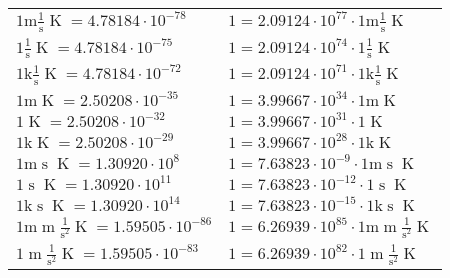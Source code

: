 \begin{center}
\begin{longtable}{l l}
{\color{gray}$1 \bm{\mathrm{ m}}{}\frac1{\operatorname{s}}{}{\operatorname{K}} = 4.78184\cdot10^{-78} $}   & {\color{gray}$ 1 = 2.09124\cdot10^{77} \cdot 1 \bm{\mathrm{ m}}{}\frac1{\operatorname{s}}{}{\operatorname{K}}$}  \\
{\color{black}$1 \bm{\mathrm{ }}{}\frac1{\operatorname{s}}{}{\operatorname{K}} = 4.78184\cdot10^{-75} $}   & {\color{black}$ 1 = 2.09124\cdot10^{74} \cdot 1 \bm{\mathrm{ }}{}\frac1{\operatorname{s}}{}{\operatorname{K}}$}  \\
{\color{gray}$1 \bm{\mathrm{ k}}{}\frac1{\operatorname{s}}{}{\operatorname{K}} = 4.78184\cdot10^{-72} $}   & {\color{gray}$ 1 = 2.09124\cdot10^{71} \cdot 1 \bm{\mathrm{ k}}{}\frac1{\operatorname{s}}{}{\operatorname{K}}$}  \\
{\color{gray}$1 \bm{\mathrm{ m}}{}{}{}{\operatorname{K}} = 2.50208\cdot10^{-35} $}   & {\color{gray}$ 1 = 3.99667\cdot10^{34} \cdot 1 \bm{\mathrm{ m}}{}{}{}{\operatorname{K}}$}  \\
{\color{black}$1 \bm{\mathrm{ }}{}{}{}{\operatorname{K}} = 2.50208\cdot10^{-32} $}   & {\color{black}$ 1 = 3.99667\cdot10^{31} \cdot 1 \bm{\mathrm{ }}{}{}{}{\operatorname{K}}$}  \\
{\color{gray}$1 \bm{\mathrm{ k}}{}{}{}{\operatorname{K}} = 2.50208\cdot10^{-29} $}   & {\color{gray}$ 1 = 3.99667\cdot10^{28} \cdot 1 \bm{\mathrm{ k}}{}{}{}{\operatorname{K}}$}  \\
{\color{gray}$1 \bm{\mathrm{ m}}{}{\operatorname{s}}{}{\operatorname{K}} = 1.30920\cdot10^{8} $}   & {\color{gray}$ 1 = 7.63823\cdot10^{-9} \cdot 1 \bm{\mathrm{ m}}{}{\operatorname{s}}{}{\operatorname{K}}$}  \\
{\color{black}$1 \bm{\mathrm{ }}{}{\operatorname{s}}{}{\operatorname{K}} = 1.30920\cdot10^{11} $}   & {\color{black}$ 1 = 7.63823\cdot10^{-12} \cdot 1 \bm{\mathrm{ }}{}{\operatorname{s}}{}{\operatorname{K}}$}  \\
{\color{gray}$1 \bm{\mathrm{ k}}{}{\operatorname{s}}{}{\operatorname{K}} = 1.30920\cdot10^{14} $}   & {\color{gray}$ 1 = 7.63823\cdot10^{-15} \cdot 1 \bm{\mathrm{ k}}{}{\operatorname{s}}{}{\operatorname{K}}$}  \\
{\color{gray}$1 \bm{\mathrm{ m}}{\operatorname{m}}\frac1{\operatorname{s}^2}{}{\operatorname{K}} = 1.59505\cdot10^{-86} $}   & {\color{gray}$ 1 = 6.26939\cdot10^{85} \cdot 1 \bm{\mathrm{ m}}{\operatorname{m}}\frac1{\operatorname{s}^2}{}{\operatorname{K}}$}  \\
{\color{black}$1 \bm{\mathrm{ }}{\operatorname{m}}\frac1{\operatorname{s}^2}{}{\operatorname{K}} = 1.59505\cdot10^{-83} $}   & {\color{black}$ 1 = 6.26939\cdot10^{82} \cdot 1 \bm{\mathrm{ }}{\operatorname{m}}\frac1{\operatorname{s}^2}{}{\operatorname{K}}$}  \\

\end{longtable}
\end{center}
